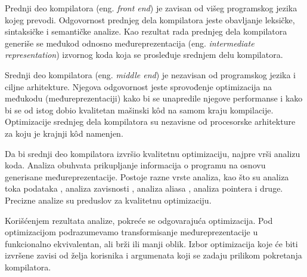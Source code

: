 \documentclass[12pt,oneside]{memoir}
\begin{document}
Prednji deo kompilatora (eng. \textit{front end}) je zavisan od višeg programskog jezika kojeg prevodi. Odgovornost prednjeg dela kompilatora jeste obavljanje leksičke, sintaksičke i semantičke analize. Kao rezultat rada prednjeg dela kompilatora generiše se međukod odnosno međureprezentacija (eng. \textit{intermediate representation}) izvornog koda koja se prosleđuje srednjem delu kompilatora.

Srednji deo kompilatora (eng. \textit{middle end}) je nezavisan od programskog jezika i ciljne arhitekture. Njegova odgovornost jeste sprovođenje optimizacija na međukodu (međureprezentaciji) kako bi se unapredile njegove performanse i kako bi se od istog dobio kvalitetan mašinski k\^od na samom kraju kompilacije. Optimizacije srednjeg dela kompilatora su nezavisne od procesorske arhitekture za koju je krajnji k\^od namenjen. 

Da bi srednji deo kompilatora izvršio kvalitetnu optimizaciju, najpre vrši analizu koda.
Analiza obuhvata prikupljanje informacija o programu na osnovu generisane
međureprezentacije. Postoje razne vrste analiza, kao što su analiza toka podataka \cite{data_flow_analysis}, analiza zavisnosti \cite{dependence_analysis}, analiza 
aliasa \cite{alias_analysis}, analiza pointera \cite{pointer_analysis} i druge. Precizne analize su 
preduslov za kvalitetnu optimizaciju. 

Korišćenjem rezultata analize, pokreće se odgovarajuća optimizacija.
Pod optimizacijom podrazumevamo transformisanje međureprezentacije u funkcionalno
ekvivalentan, ali brži ili manji oblik. Izbor optimizacija koje će biti izvršene zavisi od želja korisnika i argumenata koji se zadaju prilikom pokretanja kompilatora. 

\end{document}
